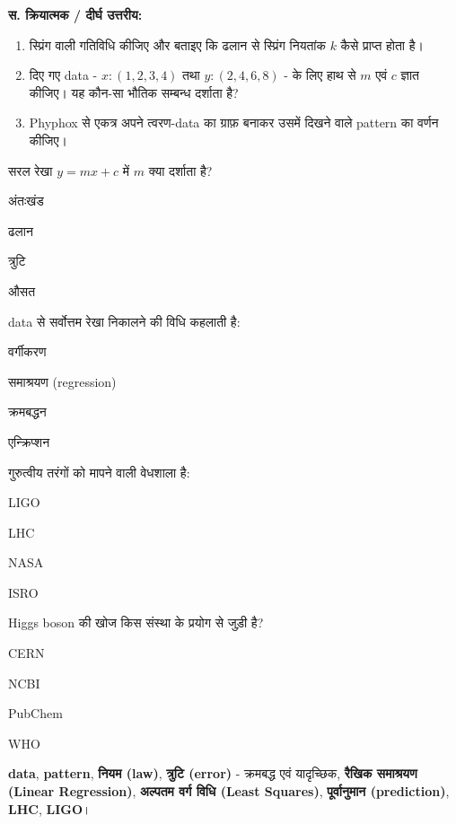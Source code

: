 \textbf{स. क्रियात्मक / दीर्घ उत्तरीय:}
\begin{enumerate}[leftmargin=1.6em]
  \item स्प्रिंग वाली गतिविधि कीजिए और बताइए कि ढलान से स्प्रिंग नियतांक $k$ कैसे
        प्राप्त होता है।
  \item दिए गए data - $x:(1,2,3,4)$ तथा $y:(2,4,6,8)$ - के लिए हाथ से $m$ एवं $c$
        ज्ञात कीजिए। यह कौन-सा भौतिक सम्बन्ध दर्शाता है?
  \item Phyphox से एकत्र अपने त्वरण-data का ग्राफ़ बनाकर उसमें दिखने वाले pattern का
        वर्णन कीजिए।
\end{enumerate}

\begin{mcq}
  \item सरल रेखा $y=mx+c$ में $m$ क्या दर्शाता है?
    \begin{choices}\item अंतःखंड \item ढलान \item त्रुटि \item औसत\end{choices}
  \item data से सर्वोत्तम रेखा निकालने की विधि कहलाती है:
    \begin{choices}\item वर्गीकरण \item समाश्रयण (regression)
      \item क्रमबद्धन \item एन्क्रिप्शन\end{choices}
  \item गुरुत्वीय तरंगों को मापने वाली वेधशाला है:
    \begin{choices}\item LIGO \item LHC \item NASA \item ISRO\end{choices}
  \item Higgs boson की खोज किस संस्था के प्रयोग से जुड़ी है?
    \begin{choices}\item CERN \item NCBI \item PubChem \item WHO\end{choices}
\end{mcq}

\begin{mukhyashabd}
\textbf{data}, \textbf{pattern}, \textbf{नियम (law)}, \textbf{त्रुटि (error)} -
क्रमबद्ध एवं यादृच्छिक, \textbf{रैखिक समाश्रयण (Linear Regression)},
\textbf{अल्पतम वर्ग विधि (Least Squares)}, \textbf{पूर्वानुमान (prediction)},
\textbf{LHC}, \textbf{LIGO}।
\end{mukhyashabd}
